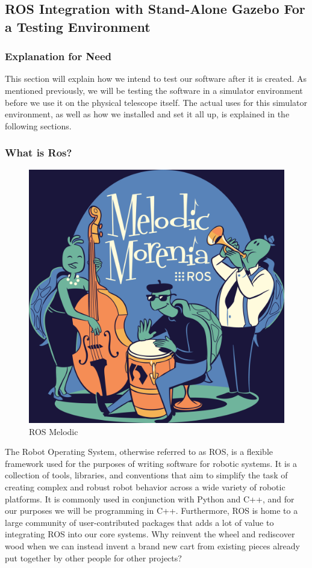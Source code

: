 \documentclass[12pt]{article}
\begin{document}
\subsection{ROS Integration with Stand-Alone Gazebo For a Testing Environment}

\subsubsection{Explanation for Need}

This section will explain how we intend to test our software after it is created. As mentioned previously, we will be testing the software in a simulator environment before we use it on the physical telescope itself. The actual uses for this simulator environment, as well as how we installed and set it all up, is explained in the following sections.

\subsubsection{What is Ros?}

\begin{figure}[h]
	\centering
	\includegraphics[width=0.50\linewidth]{melodic}
	\caption{ROS Melodic}
\end{figure}

The Robot Operating System, otherwise referred to as ROS, is a flexible framework used for the purposes of writing software for robotic systems. It is a collection of tools, libraries, and conventions that aim to simplify the task of creating complex and robust robot behavior across a wide variety of robotic platforms.\cite{ROSDescription} It is commonly used in conjunction with Python and C++, and for our purposes we will be programming in C++. Furthermore, ROS is home to a large community of user-contributed packages that adds a lot of value to integrating ROS into our core systems. Why reinvent the wheel and rediscover wood when we can instead invent a brand new cart from existing pieces already put together by other people for other projects?
\end{document}
